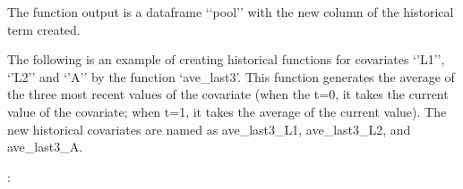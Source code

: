 \documentclass[letterpaper,10pt,english]{sphinxmanual}
\begin{document}
\sphinxAtStartPar
The function output is a dataframe ‘‘pool’’ with the new column of the historical term created.

\sphinxAtStartPar
The following is an example of creating historical functions for covariates ‘’L1’’, ‘’L2’’ and ‘’A’’ by the function
‘ave\_last3’. This function generates the average of the three most recent values of the covariate (when the
t=0, it takes the current value of the covariate; when t=1, it takes the average of the current value).
The new historical covariates are named as ave\_last3\_L1, ave\_last3\_L2, and ave\_last3\_A.

\sphinxAtStartPar
{}:

\begin{sphinxVerbatim}[commandchars=\\\{\}]
     

      
         
            \PYG{p}{[}\PYG{p}{[}\PYG{p}{]}    \PYG{p}{[}\PYG{p}{]}  \PYG{p}{]}\PYG{p}{[}\PYG{p}{]}
            \PYG{p}{[}\PYG{p}{[}\PYG{p}{]}      \PYG{p}{[}\PYG{p}{]}  \PYG{p}{]}\PYG{p}{[}\PYG{p}{]}
       


\end{sphinxVerbatim}
\end{document}
